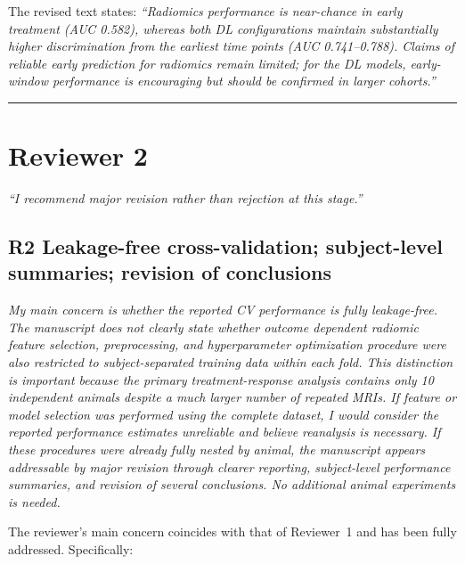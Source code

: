 \documentclass[12pt]{article}
\newcommand{\rc}[1]{\begin{reviewerbox}\itshape #1\end{reviewerbox}}
\begin{document}
The revised text states: \textit{``Radiomics performance is near-chance in early treatment (AUC 0.582), whereas both DL configurations maintain substantially higher discrimination from the earliest time points (AUC 0.741--0.788). Claims of reliable early prediction for radiomics remain limited; for the DL models, early-window performance is encouraging but should be confirmed in larger cohorts.''}

\vspace{18pt}\hrule\vspace{18pt}

\vspace{6pt}%
\section*{Reviewer 2}

\textit{``I recommend major revision rather than rejection at this stage.''}

\bigskip

\vspace{6pt}%
\subsection*{R2 \quad Leakage-free cross-validation; subject-level summaries; revision of conclusions}

\rc{My main concern is whether the reported CV performance is fully leakage-free. The manuscript does not clearly state whether outcome dependent radiomic feature selection, preprocessing, and hyperparameter optimization procedure were also restricted to subject-separated training data within each fold. This distinction is important because the primary treatment-response analysis contains only 10 independent animals despite a much larger number of repeated MRIs. If feature or model selection was performed using the complete dataset, I would consider the reported performance estimates unreliable and believe reanalysis is necessary. If these procedures were already fully nested by animal, the manuscript appears addressable by major revision through clearer reporting, subject-level performance summaries, and revision of several conclusions. No additional animal experiments is needed.}

The reviewer's main concern coincides with that of Reviewer~1 and has been fully addressed. Specifically:
\end{document}
